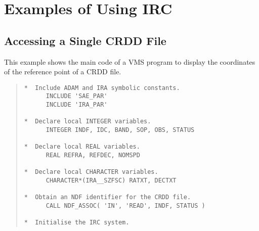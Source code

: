 \section {Examples of Using IRC}
\label{APP:EXAMS}
\subsection {Accessing a Single CRDD File}
This example shows the main code of a VMS program to display the coordinates of 
the reference point of a CRDD file.

\begin{quote}
\begin{tabbing} %

\verb#*  Include ADAM and IRA symbolic constants.            #\\
\verb#      INCLUDE 'SAE_PAR'                                #\\
\verb#      INCLUDE 'IRA_PAR'                                #\\
\verb#                                                       #\\
\verb#*  Declare local INTEGER variables.                    #\\
\verb#      INTEGER INDF, IDC, BAND, SOP, OBS, STATUS        #\\
\verb#                                                       #\\
\verb#*  Declare local REAL variables.                       #\\
\verb#      REAL REFRA, REFDEC, NOMSPD                       #\\
\verb#                                                       #\\
\verb#*  Declare local CHARACTER variables.                  #\\
\verb#      CHARACTER*(IRA__SZFSC) RATXT, DECTXT             #\\
\verb#                                                       #\\
\verb#*  Obtain an NDF identifier for the CRDD file.         #\\
\verb#      CALL NDF_ASSOC( 'IN', 'READ', INDF, STATUS )     #\\
\verb#                                                       #\\
\verb#*  Initialise the IRC system.                          #\\

\end{tabbing}
\end{quote}
